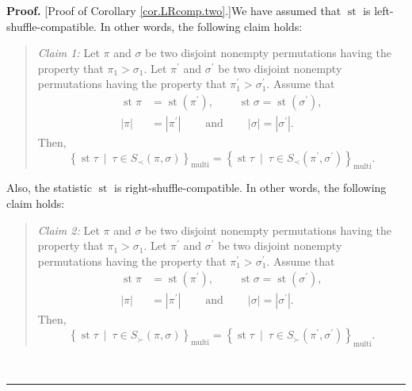 \documentclass[numbers=enddot,12pt,final,onecolumn,notitlepage]{scrartcl}%
\theoremstyle{definition}
\newenvironment{statement}{\begin{quote}}{\end{quote}}
\newenvironment{proof}[1][Proof]{\noindent\textbf{#1.} }{\ \rule{0.5em}{0.5em}}
\newenvironment{verlong}{}{}
\begin{document}
\begin{verlong}
\begin{proof}
[Proof of Corollary \ref{cor.LRcomp.two}.]We have assumed that
$\operatorname{st}$ is left-shuffle-compatible. In other words, the following
claim holds:

\begin{statement}
\textit{Claim 1:} Let $\pi$ and $\sigma$ be two disjoint nonempty permutations
having the property that $\pi_{1}>\sigma_{1}$. Let $\pi^{\prime}$ and
$\sigma^{\prime}$ be two disjoint nonempty permutations having the property
that $\pi_{1}^{\prime}>\sigma_{1}^{\prime}$. Assume that%
\begin{align*}
\operatorname{st} \pi    &  =\operatorname{st}\left(
\pi^{\prime}\right)  ,\ \ \ \ \ \ \ \ \ \ \operatorname{st} \sigma
=\operatorname{st}\left(  \sigma^{\prime}\right)  ,\\
\left\vert \pi\right\vert  &  =\left\vert \pi^{\prime}\right\vert
\ \ \ \ \ \ \ \ \ \ \text{and}\ \ \ \ \ \ \ \ \ \ \left\vert \sigma\right\vert
=\left\vert \sigma^{\prime}\right\vert .
\end{align*}
Then,
\[
\left\{  \operatorname{st} \tau   \ \mid\ \tau\in S_{\prec
}\left(  \pi,\sigma\right)  \right\}  _{\operatorname*{multi}}=\left\{
\operatorname{st} \tau   \ \mid\ \tau\in S_{\prec}\left(
\pi^{\prime},\sigma^{\prime}\right)  \right\}  _{\operatorname*{multi}}.
\]

\end{statement}

Also, the statistic $\operatorname{st}$ is right-shuffle-compatible. In other
words, the following claim holds:

\begin{statement}
\textit{Claim 2:} Let $\pi$ and $\sigma$ be two disjoint nonempty permutations
having the property that $\pi_{1}>\sigma_{1}$. Let $\pi^{\prime}$ and
$\sigma^{\prime}$ be two disjoint nonempty permutations having the property
that $\pi_{1}^{\prime}>\sigma_{1}^{\prime}$. Assume that%
\begin{align*}
\operatorname{st} \pi    &  =\operatorname{st}\left(
\pi^{\prime}\right)  ,\ \ \ \ \ \ \ \ \ \ \operatorname{st} \sigma
= \operatorname{st}\left(  \sigma^{\prime}\right)  ,\\
\left\vert \pi\right\vert  &  =\left\vert \pi^{\prime}\right\vert
\ \ \ \ \ \ \ \ \ \ \text{and}\ \ \ \ \ \ \ \ \ \ \left\vert \sigma\right\vert
=\left\vert \sigma^{\prime}\right\vert .
\end{align*}
Then,
\[
\left\{  \operatorname{st} \tau   \ \mid\ \tau\in S_{\succ
}\left(  \pi,\sigma\right)  \right\}  _{\operatorname*{multi}}=\left\{
\operatorname{st} \tau   \ \mid\ \tau\in S_{\succ}\left(
\pi^{\prime},\sigma^{\prime}\right)  \right\}  _{\operatorname*{multi}}.
\]


\end{statement}
\end{proof}
\end{verlong}
\end{document}
